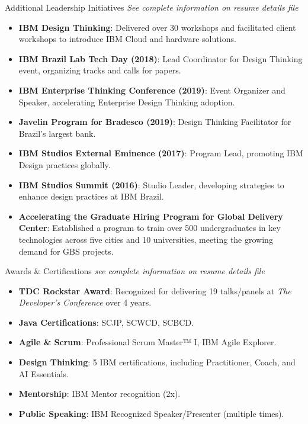 \documentclass{resume} %
\begin{document}
\begin{rSection}{Additional Leadership Initiatives}
\textit{See complete information on resume details file}
\begin{itemize}
    \item \textbf{IBM Design Thinking}: Delivered over 30 workshops and facilitated client workshops to introduce IBM Cloud and hardware solutions.
    \item \textbf{IBM Brazil Lab Tech Day (2018)}: Lead Coordinator for Design Thinking event, organizing tracks and calls for papers.
    \item \textbf{IBM Enterprise Thinking Conference (2019)}: Event Organizer and Speaker, accelerating Enterprise Design Thinking adoption.
    \item \textbf{Javelin Program for Bradesco (2019)}: Design Thinking Facilitator for Brazil’s largest bank.
    \item \textbf{IBM Studios External Eminence (2017)}: Program Lead, promoting IBM Design practices globally.
    \item \textbf{IBM Studios Summit (2016)}: Studio Leader, developing strategies to enhance design practices at IBM Brazil.
    \item \textbf{Accelerating the Graduate Hiring Program for Global Delivery Center}: Established a program to train over 500 undergraduates in key technologies across five cities and 10 universities, meeting the growing demand for GBS projects.
\end{itemize}
\end{rSection}



\begin{rSection}{Awards \& Certifications}
\textit{see complete information on resume details file}
\begin{itemize}
    \item \textbf{TDC Rockstar Award}: Recognized for delivering 19 talks/panels at \textit{The Developer's Conference} over 4 years.
    \item \textbf{Java Certifications}: SCJP, SCWCD, SCBCD.
    \item \textbf{Agile \& Scrum}: Professional Scrum Master™ I, IBM Agile Explorer.
    \item \textbf{Design Thinking}: 5 IBM certifications, including Practitioner, Coach, and AI Essentials.
    \item \textbf{Mentorship}: IBM Mentor recognition (2x).
    \item \textbf{Public Speaking}: IBM Recognized Speaker/Presenter (multiple times).
\end{itemize}
\end{rSection}
\end{document}
